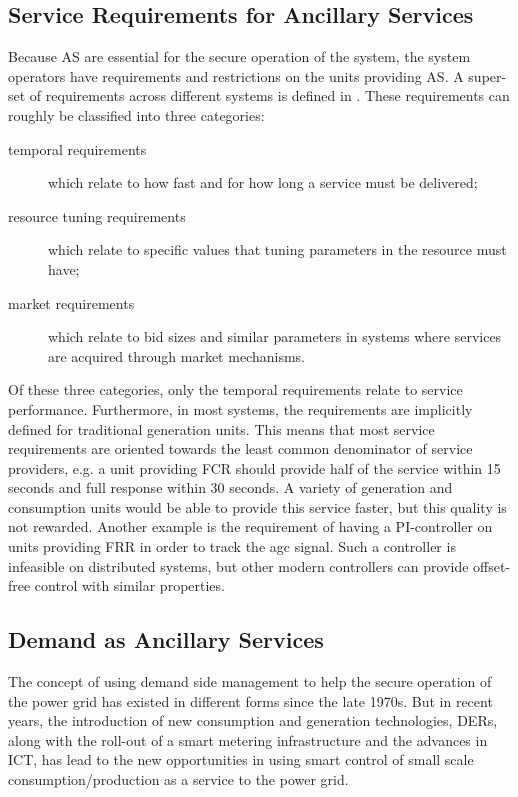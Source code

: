 \subsection{Service Requirements for Ancillary Services} %
\label{sub:servreqAS}
Because AS are essential for the secure operation of the system, the system operators have requirements and restrictions on the units providing AS. A super-set of requirements across different systems is defined in . These requirements can roughly be classified into three categories:
\begin{description}
	\item[temporal requirements] which relate to how fast and for how long a service must be delivered;
	\item[resource tuning requirements] which relate to specific values that tuning parameters in the resource must have;
	\item[market requirements] which relate to bid sizes and similar parameters in systems where services are acquired through market mechanisms.
\end{description}

Of these three categories, only the temporal requirements relate to service performance. Furthermore, in most systems, the requirements are implicitly defined for traditional generation units. This means that most service requirements are oriented towards the least common denominator of service providers, e.g. a unit providing FCR should provide half of the service within 15 seconds and full response within 30 seconds. A variety of generation and consumption units would be able to provide this service faster, but this quality is not rewarded. Another example is the requirement of having a PI-controller on units providing FRR in order to track the \gls{agc} signal. Such a controller is infeasible on distributed systems, but other modern controllers can provide offset-free control with similar properties.
\subsection{Demand as Ancillary Services} %
\label{sub:demandAS}
The concept of using demand side management to help the secure operation of the power grid has existed in different forms since the late 1970s. But in recent years, the introduction of new consumption and generation technologies, \ie DERs, along with the roll-out of a smart metering infrastructure and the advances in ICT, has lead to the new opportunities in using smart control of small scale consumption/production as a service to the power grid. 


